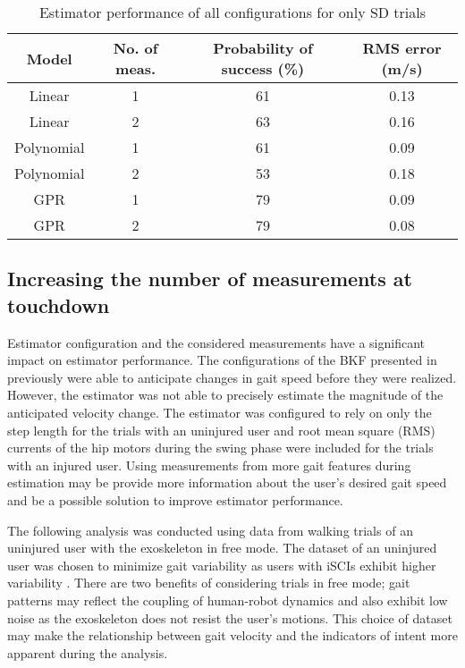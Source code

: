 \begin{table} %
	\centering
	\caption{Estimator performance of all configurations for only SD trials} \label{table:sd}
	\small
	\begin{tabular}{|c|c|c|c|}
		\hline
		Model & No. of meas. & Probability of success (\%) & RMS error (m/s)\\
		\hline
		Linear & 1 & 61 & 0.13 \\
		\hline
		Linear & 2 & 63 & 0.16 \\
		\hline
		Polynomial & 1 & 61 & 0.09 \\
		\hline
		Polynomial & 2 & 53 & 0.18 \\
		\hline
		GPR & 1 & 79 & 0.09 \\
		\hline
		GPR & 2 & 79 & 0.08 \\
		\hline
	\end{tabular}
\end{table}

\subsection{Increasing the number of measurements at touchdown}
Estimator configuration and the considered measurements have a significant impact on estimator performance. The configurations of the BKF presented in previously were able to anticipate changes in gait speed before they were realized. However, the estimator was not able to precisely estimate the magnitude of the anticipated velocity change. The estimator was configured to rely on only the step length for the trials with an uninjured user and root mean square (RMS) currents of the hip motors during the swing phase were included for the trials with an injured user. Using measurements from more gait features during estimation may be provide more information about the user's desired gait speed and be a possible solution to improve estimator performance.

The following analysis was conducted using data from walking trials of an uninjured user with the exoskeleton in free mode. The dataset of an uninjured user was chosen to minimize gait variability as users with iSCIs exhibit higher variability \cite{sohn2018variability}. There are two benefits of considering trials in free mode; gait patterns may reflect the coupling of human-robot dynamics and also exhibit low noise as the exoskeleton does not resist the user's motions. This choice of dataset may make the relationship between gait velocity and the indicators of intent more apparent during the analysis. 

